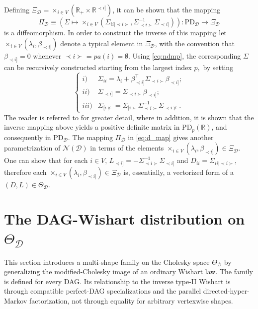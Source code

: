 \documentclass[12pt]{article}
\newcommand{\R}{\mathbb{R}}
\newcommand{\D}{\mathcal{D}}
\theoremstyle{plain}
\theoremstyle{definition}
\theoremstyle{remark}
\begin{document}
  Defining
  $\Xi_{\D}=\times_{i\in V}\left(\R_{+}\times\R^{\prec i]}\right)$, it can be shown that the mapping
  \begin{equation} \label{eq:d_map}
  \Pi_{\D}\equiv\left(\Sigma\mapsto\times_{i\in V}( \Sigma_{ii|\prec i\succ}, \Sigma^{-1}_{\prec i\succ}\Sigma_{\prec i]})\right):  \mathrm{PD}_{\D}\rightarrow\Xi_{\D}
  \end{equation}
   is a diffeomorphism. In order to construct the inverse of this mapping let $\times_{i\in V} (\lambda_i, \beta_{\prec i]})$ denote a typical element in  $\Xi_{\D}$, with the convention that $\beta_{\prec i]}=0$ whenever $\prec i\succ = pa(i) = \emptyset$. Using \eqref{eq:ndmp}, the corresponding  $\Sigma$ can be recursively constructed starting from the largest index $p,$ by setting
%
\begin{equation}\label{completion_alg_QG}
\begin{cases}
  i)& \Sigma_{ii}=\lambda_i+ \beta_{\prec i]}^{\top}\Sigma_{\prec i\succ}\beta_{\prec i]};\\
	ii)& \Sigma_{\prec i]}=\Sigma_{\prec i\succ}\beta_{\prec i]};\\
	iii)&\Sigma_{[i \nsucc}=\Sigma_{[i \succ}\Sigma^{-1}_{\prec  i \succ}\Sigma_{\prec i \nsucc}.
	\end{cases}
\end{equation}
%
\noindent The reader is referred to \cite{andersson98} for greater detail, where in addition, it is shown that the inverse mapping above yields a positive
definite matrix in $\mathrm{PD}_{p}(\R)$, and consequently in $\mathrm{PD}_{\D}$. The mapping $\Pi_{\D}$ in \eqref{eq:d_map} gives another parametrization of $\mathscr{N}(\D)$ in terms of the elements $\times_{i\in V} \left(\lambda_i,\beta_{\prec i]} 
\right)\in \Xi_{\D}$. One can show that for each $i\in V$, $L_{\prec i]}=-\Sigma_{\prec i\succ}^{-1}\Sigma_{\prec i]}$ and $D_{ii}=\Sigma_{ii|\prec i\succ}$, therefore  each  $\times_{i\in V} \left(\lambda_i,\beta_{\prec i]} 
\right)\in \Xi_{\D}$ is, essentially, a vectorized form of a $(D,L)\in \Theta_{\D}$.

\section{The DAG-Wishart distribution on $\Theta_{\D}$}{\label{sec: wdag}} 
This section introduces a multi-shape family on the Cholesky space
$\Theta_{\D}$ by generalizing the modified-Cholesky image of an ordinary
Wishart law.  The family is defined for every DAG.  Its relationship to
the inverse type-II Wishart is through compatible perfect-DAG
specializations and the parallel directed-hyper-Markov factorization, not
through equality for arbitrary vertexwise shapes.
%
%
%
%
\end{document}
